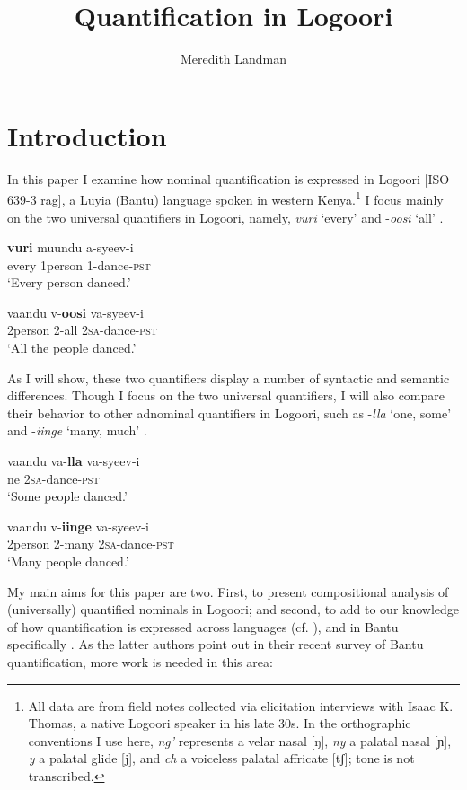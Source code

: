 \documentclass[output=paper]{langsci/langscibook}
\title{Quantification in Logoori}
\author{%
 Meredith Landman \affiliation{Pomona College} 
}
\begin{document}
 
 

\section{Introduction}

In this paper I examine how nominal quantification is expressed in Logoori [ISO 639-3
{rag}], a Luyia (Bantu) language spoken in western Kenya.\footnote{All data are from field notes collected via elicitation interviews with Isaac K. Thomas, a native Logoori speaker in his late 30s. In the orthographic conventions I use here, \textit{ng'} represents a velar nasal [ŋ], \textit{ny} a palatal nasal [ɲ], \textit{y} a palatal glide [j], and \textit{ch} a voiceless palatal affricate [tʃ]; tone is not transcribed.
} I focus mainly on the two universal quantifiers in Logoori, namely, \textit{vuri} ‘every’  and -\textit{oosi} ‘all’ .

\ea
\ea
\gll \textbf{vuri}  muundu  a-syeev-i\\
     every  1person  1-dance-\textsc{pst}\\
\glt ‘Every person danced.’

\ex
\gll   vaandu  v-\textbf{oosi}    va-syeev-i\\
     2person  2-all    2\textsc{sa}-dance-\textsc{pst}\\
\glt ‘All the people danced.’
\z
\z

As I will show, these two quantifiers display a number of syntactic and semantic differences. Though I focus on the two universal quantifiers, I will also compare their behavior to other adnominal quantifiers in Logoori, such as -\textit{lla} ‘one, some’  and -\textit{iinge} ‘many, much’ .


\ea
\ea
\gll   vaandu  va-\textbf{lla}    va-syeev-i\\
ne    2\textsc{sa}-dance-\textsc{pst}\\
\glt ‘Some people danced.’


\ex
 \gll vaandu  v-\textbf{iinge}  va-syeev-i\\
     2person  2-many  2\textsc{sa}-dance-\textsc{pst}\\
\glt ‘Many people danced.’\\
\z
\z

My main aims for this paper are two. First, to present compositional analysis of (universally) quantified nominals in Logoori; and second, to add to our knowledge of how quantification is expressed across languages (cf. \citealt{Matthewson2013}), and in Bantu specifically \citep{ZerbianKrifka2008}. As the latter authors point out in their recent survey of Bantu quantification, more work is needed in this area:
\end{document}
